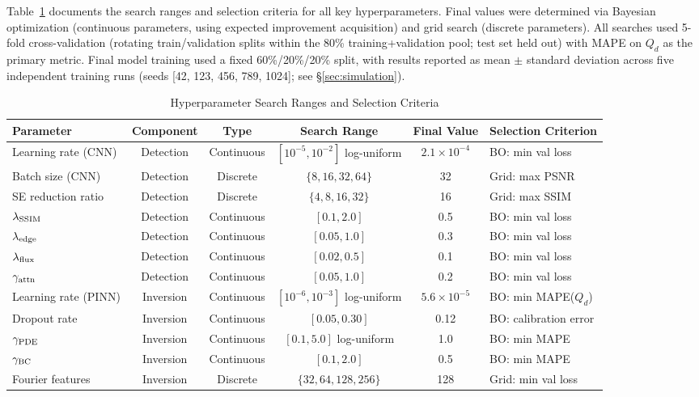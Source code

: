 \documentclass[usenatbib]{mnras}
\begin{document}
Table~\ref{tab:hyper_search} documents the search ranges and selection criteria for all key hyperparameters. Final values were determined via Bayesian optimization (continuous parameters, using expected improvement acquisition) and grid search (discrete parameters). All searches used 5-fold cross-validation (rotating train/validation splits within the 80\% training+validation pool; test set held out) with MAPE on $Q_d$ as the primary metric. Final model training used a fixed 60\%/20\%/20\% split, with results reported as mean $\pm$ standard deviation across five independent training runs (seeds [42, 123, 456, 789, 1024]; see \S\ref{sec:simulation}).

\begin{table}
\centering
\caption{Hyperparameter Search Ranges and Selection Criteria}\label{tab:hyper_search}
\begin{tabular}{lccccl}
\toprule
Parameter & Component & Type & Search Range & Final Value & Selection Criterion \\
\midrule
Learning rate (CNN) & Detection & Continuous & $[10^{-5}, 10^{-2}]$ log-uniform & $2.1 \times 10^{-4}$ & BO: min val loss \\
Batch size (CNN) & Detection & Discrete & $\{8, 16, 32, 64\}$ & 32 & Grid: max PSNR \\
SE reduction ratio & Detection & Discrete & $\{4, 8, 16, 32\}$ & 16 & Grid: max SSIM \\
$\lambda_{\rm SSIM}$ & Detection & Continuous & $[0.1, 2.0]$ & 0.5 & BO: min val loss \\
$\lambda_{\rm edge}$ & Detection & Continuous & $[0.05, 1.0]$ & 0.3 & BO: min val loss \\
$\lambda_{\rm flux}$ & Detection & Continuous & $[0.02, 0.5]$ & 0.1 & BO: min val loss \\
$\gamma_{\rm attn}$ & Detection & Continuous & $[0.05, 1.0]$ & 0.2 & BO: min val loss \\
\midrule
Learning rate (PINN) & Inversion & Continuous & $[10^{-6}, 10^{-3}]$ log-uniform & $5.6 \times 10^{-5}$ & BO: min MAPE($Q_d$) \\
Dropout rate & Inversion & Continuous & $[0.05, 0.30]$ & 0.12 & BO: calibration error \\
$\gamma_{\rm PDE}$ & Inversion & Continuous & $[0.1, 5.0]$ log-uniform & 1.0 & BO: min MAPE \\
$\gamma_{\rm BC}$ & Inversion & Continuous & $[0.1, 2.0]$ & 0.5 & BO: min MAPE \\
Fourier features & Inversion & Discrete & $\{32, 64, 128, 256\}$ & 128 & Grid: min val loss \\

\end{tabular}
\end{table}
\end{document}
